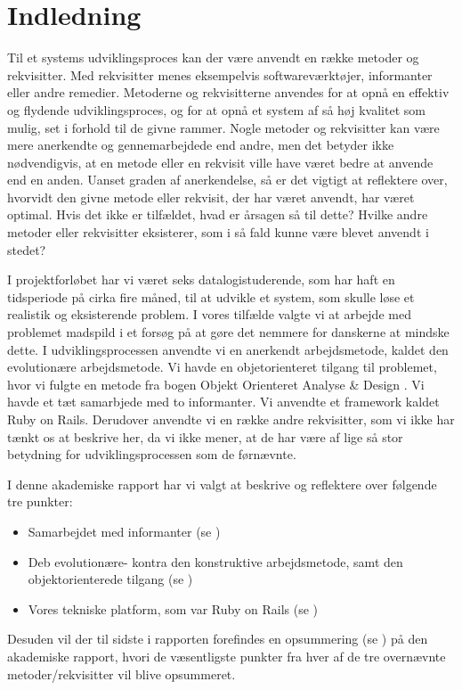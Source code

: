 \chapter{Indledning}

Til et systems udviklingsproces kan der være anvendt en række metoder og rekvisitter. Med rekvisitter menes eksempelvis softwareværktøjer, informanter eller andre remedier. Metoderne og rekvisitterne anvendes for at opnå en effektiv og flydende udviklingsproces, og for at opnå et system af så høj kvalitet som mulig, set i forhold til de givne rammer. Nogle metoder og rekvisitter kan være mere anerkendte og gennemarbejdede end andre, men det betyder ikke nødvendigvis, at en metode eller en rekvisit ville have været bedre at anvende end en anden. Uanset graden af anerkendelse, så er det vigtigt at reflektere over, hvorvidt den givne metode eller rekvisit, der har været anvendt, har været optimal. Hvis det ikke er tilfældet, hvad er årsagen så til dette? Hvilke andre metoder eller rekvisitter eksisterer, som i så fald kunne være blevet anvendt i stedet?

I projektforløbet har vi været seks datalogistuderende, som har haft en tidsperiode på cirka fire måned, til at udvikle et system, som skulle løse et realistik og eksisterende problem. I vores tilfælde valgte vi at arbejde med problemet madspild i et forsøg på at gøre det nemmere for danskerne at mindske dette. I udviklingsprocessen anvendte vi en anerkendt arbejdsmetode, kaldet den evolutionære arbejdsmetode. Vi havde en objetorienteret tilgang til problemet, hvor vi fulgte en metode fra bogen Objekt Orienteret Analyse \& Design \cite{ooad}. Vi havde et tæt samarbjede med to informanter. Vi anvendte et framework kaldet Ruby on Rails. Derudover anvendte vi en række andre rekvisitter, som vi ikke har tænkt os at beskrive her, da vi ikke mener, at de har være af lige så stor betydning for udviklingsprocessen som de førnævnte.

I denne akademiske rapport har vi valgt at beskrive og reflektere over følgende tre punkter:

\begin{itemize}[noitemsep]
  \item Samarbejdet med informanter (se )
  \item Deb evolutionære- kontra den konstruktive arbejdsmetode, samt den objektorienterede tilgang (se )
  \item Vores tekniske platform, som var Ruby on Rails (se )
\end{itemize}

Desuden vil der til sidste i rapporten forefindes en opsummering (se ) på den akademiske rapport, hvori de væsentligste punkter fra hver af de tre overnævnte metoder/rekvisitter vil blive opsummeret.

